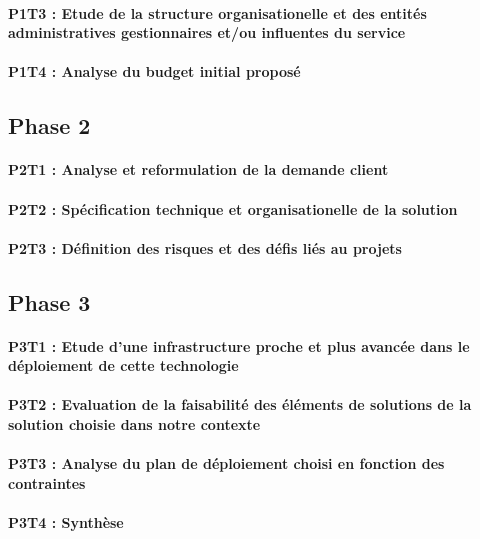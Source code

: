 \paragraph{P1T3 : Etude de la structure organisationelle et des entités administratives gestionnaires et/ou influentes du service}
\paragraph{P1T4 : Analyse du budget initial proposé}

\subsection{Phase 2}
\paragraph{P2T1 : Analyse et reformulation de la demande client}
\paragraph{P2T2 : Spécification technique et organisationelle de la solution}
\paragraph{P2T3 : Définition des risques et des défis liés au projets}

\subsection{Phase 3}
\paragraph{P3T1 : Etude d'une infrastructure proche et plus avancée dans le déploiement de cette technologie}
\paragraph{P3T2 : Evaluation de la faisabilité des éléments de solutions de la solution choisie dans notre contexte}
\paragraph{P3T3 : Analyse du plan de déploiement choisi en fonction des contraintes}
\paragraph{P3T4 : Synthèse}

